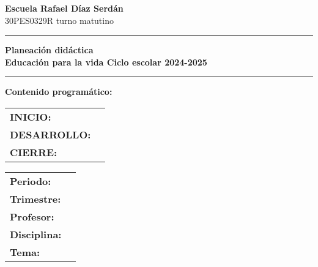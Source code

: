 \documentclass[11pt]{article}
\begin{document}
\small %

\begin{center}
    \textbf{\Huge Escuela Rafael Díaz Serdán} \\
    30PES0329R turno matutino
\end{center}

\vspace{0.2cm}
\hrule
\vspace{0.2cm}

\begin{center}
    \textbf{\Large Planeación didáctica} \\
    \textbf{\large Educación para la vida Ciclo escolar 2024-2025}
\end{center}

\vspace{0.2cm}
\hrule
\vspace{0.2cm}

\begin{minipage}[t]{0.48\textwidth}
    \textbf{Contenido programático:}
    \begin{tabularx}{\textwidth}{lX}
        \textbf{INICIO:} & \underline{\hspace{\fill}} \\
        \textbf{DESARROLLO:} & \underline{\hspace{\fill}} \\
        \textbf{CIERRE:} & \underline{\hspace{\fill}} \\
    \end{tabularx}
\end{minipage}
\hfill
\begin{minipage}[t]{0.48\textwidth}
    \vspace{-1.5cm} %
    \begin{tabularx}{\textwidth}{lX}
        \textbf{Periodo:} & \underline{\hspace{\fill}} \\
        \textbf{Trimestre:} & \underline{\hspace{\fill}} \\
        \textbf{Profesor:} & \underline{\hspace{\fill}} \\
        \textbf{Disciplina:} & \underline{\hspace{\fill}} \\
        \textbf{Tema:} & \underline{\hspace{\fill}} \\
    \end{tabularx}
\end{minipage}
\end{document}
